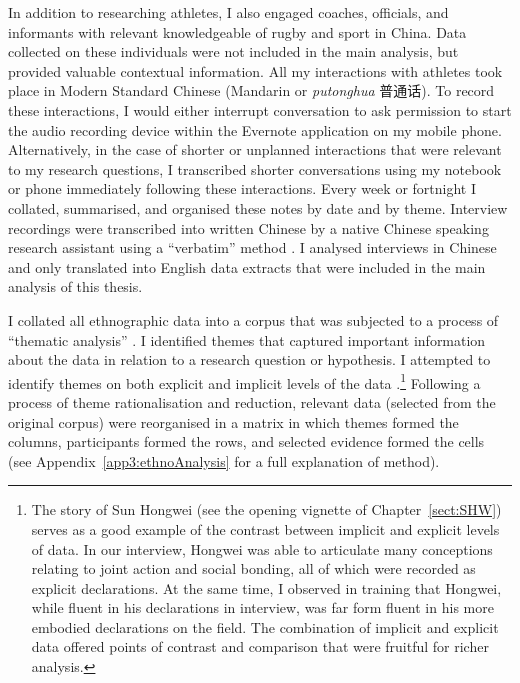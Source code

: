 \begin{CJK}{UTF8}{gbsn}
In addition to researching athletes, I also engaged coaches, officials, and informants with relevant knowledgeable of rugby and sport in China. Data collected on these individuals were not included in the main analysis, but provided valuable contextual information.
All my interactions with athletes took place in Modern Standard Chinese (Mandarin or \textit{putonghua} 普通话).  To record these interactions, I would either interrupt conversation to ask permission to start the audio recording device within the Evernote application on my mobile phone.  Alternatively, in the case of shorter or unplanned interactions that were relevant to my research questions,  I transcribed shorter conversations using my notebook or phone immediately following these interactions.  Every week or fortnight I collated, summarised, and organised these notes by date and by theme.  Interview recordings were transcribed into written Chinese by a native Chinese speaking research assistant using a ``verbatim'' method \citep[i.e., including an account of all verbal and important nonverbal (coughs, pauses, etc.) utterances, see][269-70]{Poland2003}.  I analysed interviews in Chinese and only translated into English data extracts that were included in the main analysis of this thesis.

I collated all ethnographic data into a corpus that was subjected to a process of ``thematic analysis'' \citep{Braun2006}. I identified themes that captured important information about the data in relation to a research question or hypothesis.  I attempted to identify themes on both explicit and implicit levels of the data \citep{Boyatzis1998}.\footnote{The story of Sun Hongwei (see the opening vignette of Chapter~\ref{sect:SHW}) serves as a good example of the contrast between implicit and explicit levels of data.  In our interview, Hongwei was able to articulate many conceptions relating to joint action and social bonding, all of which were recorded as explicit declarations.  At the same time, I observed in training that Hongwei, while fluent in his declarations in interview, was far form fluent in his more embodied declarations on the field.  The combination of implicit and explicit data offered points of contrast and comparison that were fruitful for richer analysis.}  Following a process of theme rationalisation and reduction,
relevant data (selected from the original corpus) were reorganised in a matrix in which themes formed the columns, participants formed the rows, and selected evidence formed the cells (see Appendix~\ref{app3:ethnoAnalysis} for a full explanation of method).





\end{CJK}
